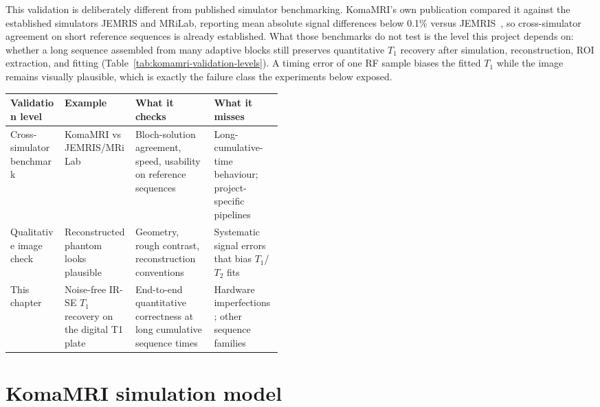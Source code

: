 This validation is deliberately different from published simulator
benchmarking. KomaMRI's own publication compared it against the established
simulators JEMRIS and MRiLab, reporting mean absolute signal differences
below 0.1\% versus
JEMRIS~\cite{komaMRI:23,stoecker_jemris_2010,liu_mrilab_2017}, so
cross-simulator agreement on short reference sequences is already
established. What those benchmarks do not test is the level this project
depends on: whether a long sequence assembled from many adaptive blocks
still preserves quantitative $T_1$ recovery after simulation,
reconstruction, ROI extraction, and fitting
(Table~\ref{tab:komamri-validation-levels}). A timing error of one RF sample
biases the fitted $T_1$ while the image remains visually plausible, which is
exactly the failure class the experiments below exposed.

\begin{center}
\begingroup
\small
{}
\setlength{\tabcolsep}{3pt}
\renewcommand{\arraystretch}{1.08}
\begin{tabularx}{\linewidth}{%
  >{\raggedright\arraybackslash}p{0.20\linewidth}
  >{\raggedright\arraybackslash}p{0.26\linewidth}
  >{\raggedright\arraybackslash}X
  >{\raggedright\arraybackslash}X}
\toprule
Validation level & Example & What it checks & What it misses \\
\midrule
Cross-simulator benchmark & KomaMRI vs JEMRIS/MRiLab~\cite{komaMRI:23} &
Bloch-solution agreement, speed, usability on reference sequences &
Long-cumulative-time behaviour; project-specific pipelines \\
Qualitative image check & Reconstructed phantom looks plausible &
Geometry, rough contrast, reconstruction conventions &
Systematic signal errors that bias $T_1$/$T_2$ fits \\
This chapter & Noise-free IR-SE $T_1$ recovery on the digital T1 plate &
End-to-end quantitative correctness at long cumulative sequence times &
Hardware imperfections; other sequence families \\
\bottomrule
\end{tabularx}
\label{tab:komamri-validation-levels}
\endgroup
\end{center}

\section{KomaMRI simulation model}
\label{sec:komamri-simulation-model}

